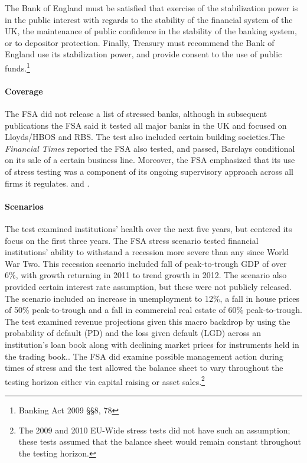 \documentclass[12pt]{article}
\begin{document}
The Bank of England must be satisfied that exercise of the stabilization power is in the public interest with regards to the stability of the financial system of the UK, the maintenance of public confidence in the stability of the banking system, or to depositor protection. Finally, Treasury must recommend the Bank of England use its stabilization power, and provide consent to the use of public funds.\footnote{Banking Act 2009 \S \S 8, 78}

\paragraph{Coverage}

The FSA did not release a list of stressed banks, although in subsequent publications the FSA said it tested all major banks in the UK and focused on Lloyds/HBOS and RBS. The test also included certain building societies.The \textit{Financial Times} reported the FSA also tested, and passed, Barclays conditional on its sale of a certain business line. Moreover, the FSA emphasized that its use of stress testing was a component of its ongoing supervisory approach across all firms it regulates. \citep{Results} and \citep{Barclays1}.

\paragraph{Scenarios} The test examined institutions' health over the next five years, but centered its focus on the first three years. The FSA stress scenario tested financial institutions' ability to withstand a recession more severe than any since World War Two. This recession scenario included fall of peak-to-trough GDP of over 6\%, with growth returning in 2011 to trend growth in 2012. The scenario also provided certain interest rate assumption, but these were not publicly released. The scenario included an increase in unemployment to 12\%, a fall in house prices of 50\% peak-to-trough and a fall in commercial real estate of 60\% peak-to-trough. The test examined revenue projections given this macro backdrop by using the probability of default (PD) and the loss given default (LGD) across an institution's loan book along with declining market prices for instruments held in the trading book.\citep{Results}. The FSA did examine possible management action during times of stress and the test allowed the balance sheet to vary throughout the testing horizon either via capital raising or asset sales.\footnote{The 2009 and 2010 EU-Wide stress tests did not have such an assumption; these tests assumed that the balance sheet would remain constant throughout the testing horizon.}
\end{document}
